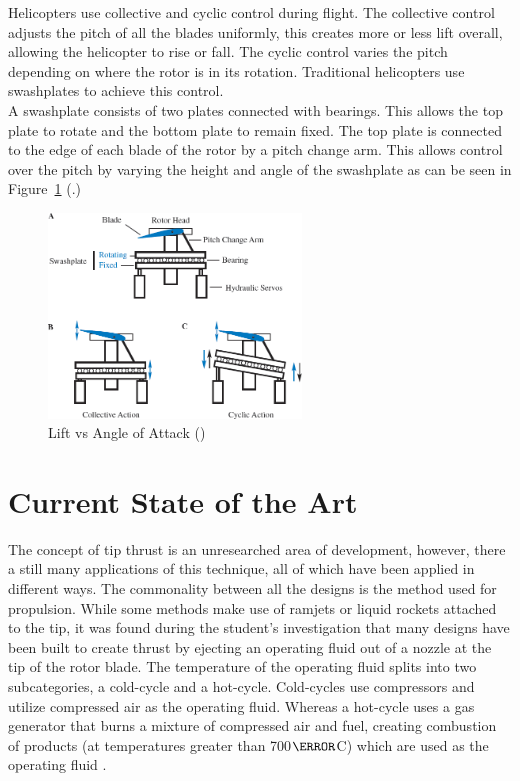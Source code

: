     Helicopters use collective and cyclic control during flight. The collective control adjusts the pitch of all the blades uniformly, this creates more or less lift overall, allowing the helicopter to rise or fall. The cyclic control varies the pitch depending on where the rotor is in its rotation. Traditional helicopters use swashplates to achieve this control.\\
    A swashplate consists of two plates connected with bearings. This allows the top plate to rotate and the bottom plate to remain fixed. The top plate is connected to the edge of each blade of the rotor by a pitch change arm. This allows control over the pitch by varying the height and angle of the swashplate as can be seen in Figure~\ref{fig:Swashplate} (\cite{anderson2010helicopters}.)
    \begin{figure}
        \centering
        \includegraphics[width = 0.6\textwidth]{figs/Swashplate.png}
        \caption{Lift vs Angle of Attack (\cite{anderson2010helicopters})}
        \label{fig:Swashplate}
    \end{figure}


\section{Current State of the Art} \label{sec:Current_design}
    The concept of tip thrust is an unresearched area of development, however, there a still many applications of this technique, all of which have been applied in different ways. The commonality between all the designs is the method used for propulsion. While some methods make use of ramjets or liquid rockets attached to the tip, it was found during the student's investigation that many designs have been built to create thrust by ejecting an operating fluid out of a nozzle at the tip of the rotor blade. The temperature of the operating fluid splits into two subcategories, a cold-cycle and a hot-cycle. Cold-cycles use compressors and utilize compressed air as the operating fluid. Whereas a hot-cycle uses a gas generator that burns a mixture of compressed air and fuel, creating combustion of products (at temperatures greater than 700\(\degree\)C) which are used as the operating fluid \citep{elmahmodi2014propulsion}.\\
   
